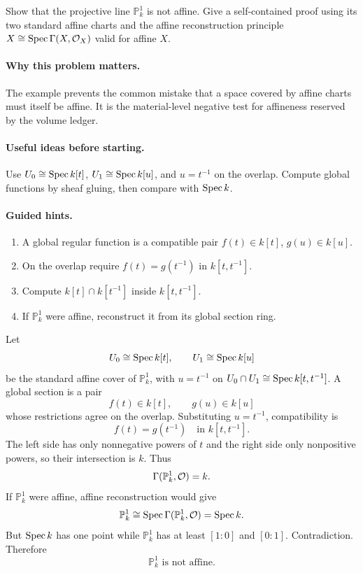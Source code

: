 \begin{problem}\label{prob:vi18-p02}
Show that the projective line $\mathbb P^1_k$ is not affine. Give a self-contained proof using its two standard affine charts and the affine reconstruction principle $X\cong\operatorname{Spec}\Gamma(X,\mathcal O_X)$ valid for affine $X$.
\end{problem}

\ifdefined\FullProblemDossiers
\paragraph{Why this problem matters.}
The example prevents the common mistake that a space covered by affine charts must itself be affine. It is the material-level negative test for affineness reserved by the volume ledger.

\paragraph{Useful ideas before starting.}
Use $U_0\cong\operatorname{Spec} k[t]$, $U_1\cong\operatorname{Spec} k[u]$, and $u=t^{-1}$ on the overlap. Compute global functions by sheaf gluing, then compare with $\operatorname{Spec} k$.

\paragraph{Guided hints.}
\begin{enumerate}
\item A global regular function is a compatible pair $f(t)\in k[t]$, $g(u)\in k[u]$.
\item On the overlap require $f(t)=g(t^{-1})$ in $k[t,t^{-1}]$.
\item Compute $k[t]\cap k[t^{-1}]$ inside $k[t,t^{-1}]$.
\item If $\mathbb P^1_k$ were affine, reconstruct it from its global section ring.
\end{enumerate}

\begin{solution}
Let
\[
U_0\cong\operatorname{Spec} k[t],\qquad U_1\cong\operatorname{Spec} k[u]
\]
be the standard affine cover of $\mathbb P^1_k$, with $u=t^{-1}$ on
$U_0\cap U_1\cong\operatorname{Spec} k[t,t^{-1}]$.
A global section is a pair
\[
f(t)\in k[t],\qquad g(u)\in k[u]
\]
whose restrictions agree on the overlap. Substituting $u=t^{-1}$, compatibility is
\[
f(t)=g(t^{-1})\quad\text{in }k[t,t^{-1}].
\]
The left side has only nonnegative powers of $t$ and the right side only nonpositive powers, so their intersection is $k$. Thus
\[
\Gamma(\mathbb P^1_k,\mathcal O)=k.
\]
If $\mathbb P^1_k$ were affine, affine reconstruction would give
\[
\mathbb P^1_k\cong\operatorname{Spec}\Gamma(\mathbb P^1_k,\mathcal O)=\operatorname{Spec} k.
\]
But $\operatorname{Spec} k$ has one point while $\mathbb P^1_k$ has at least $[1:0]$ and $[0:1]$. Contradiction. Therefore
\[
\boxed{\mathbb P^1_k\text{ is not affine}.}
\]
\end{solution}

